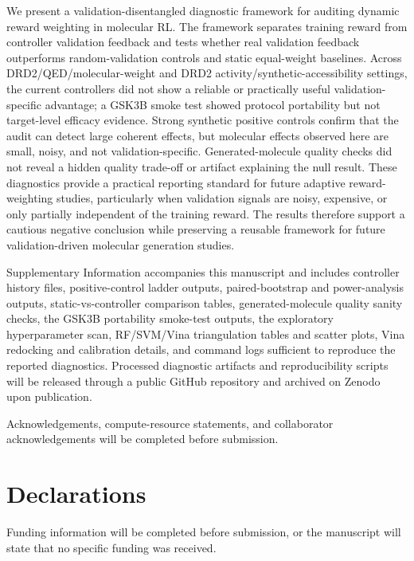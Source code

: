 \documentclass[referee,lineno,pdflatex,sn-basic]{sn-jnl}
\theoremstyle{thmstyleone}%
\theoremstyle{thmstyletwo}%
\theoremstyle{thmstylethree}%
\begin{document}
We present a validation-disentangled diagnostic framework for auditing dynamic reward weighting in molecular RL. The framework separates training reward from controller validation feedback and tests whether real validation feedback outperforms random-validation controls and static equal-weight baselines. Across DRD2/QED/molecular-weight and DRD2 activity/synthetic-accessibility settings, the current controllers did not show a reliable or practically useful validation-specific advantage; a GSK3B smoke test showed protocol portability but not target-level efficacy evidence. Strong synthetic positive controls confirm that the audit can detect large coherent effects, but molecular effects observed here are small, noisy, and not validation-specific. Generated-molecule quality checks did not reveal a hidden quality trade-off or artifact explaining the null result. These diagnostics provide a practical reporting standard for future adaptive reward-weighting studies, particularly when validation signals are noisy, expensive, or only partially independent of the training reward. The results therefore support a cautious negative conclusion while preserving a reusable framework for future validation-driven molecular generation studies.

\backmatter


Supplementary Information accompanies this manuscript and includes controller
history files, positive-control ladder outputs, paired-bootstrap and power-analysis
outputs, static-vs-controller comparison tables, generated-molecule quality sanity
checks, the GSK3B portability smoke-test outputs, the exploratory hyperparameter
scan, RF/SVM/Vina triangulation tables and scatter plots, Vina redocking and
calibration details, and command logs sufficient to reproduce the reported
diagnostics. Processed diagnostic artifacts and reproducibility scripts will be
released through a public GitHub repository and archived on Zenodo upon publication.


Acknowledgements, compute-resource statements, and collaborator acknowledgements will be completed before submission.

\section*{Declarations}

Funding information will be completed before submission, or the manuscript will state that no specific funding was received.
\end{document}
